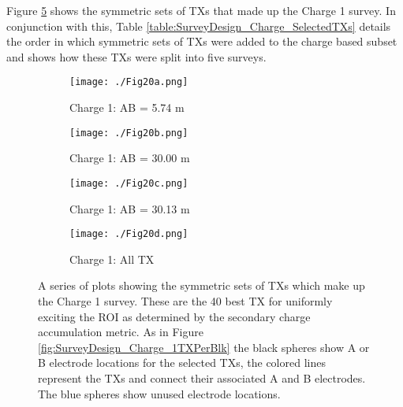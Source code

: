 \documentclass[preprint,authoryear,12pt]{elsarticle}
\begin{document}
Figure \ref{fig:SurveyDesign_Charge1_TXs} shows the symmetric sets of TXs that made up the Charge 1 survey. In conjunction with this, Table \ref{table:SurveyDesign_Charge_SelectedTXs} details the order in which symmetric sets of TXs were added to the charge based subset and shows how these TXs were split into five surveys.


\begin{figure} [htp]
   \begin{center}
      \begin{subfigure}{0.7\linewidth}
         \texttt{[image: ./Fig20a.png]}
         \caption{Charge 1: AB = 5.74 m}
         \label{fig:SurveyDesign_Charge1_ABsep5o745m}
      \end{subfigure}

      \begin{subfigure}{0.7\linewidth}
         \texttt{[image: ./Fig20b.png]}
         \caption{Charge 1: AB = 30.00 m}
         \label{fig:SurveyDesign_Charge1_ABsep30m}
      \end{subfigure}

      \begin{subfigure}{0.7\linewidth}
         \texttt{[image: ./Fig20c.png]}
         \caption{Charge 1: AB = 30.13 m}
         \label{fig:SurveyDesign_Charge1_ABsep30o13m}
      \end{subfigure}

      \begin{subfigure}{0.7\linewidth}
         \texttt{[image: ./Fig20d.png]}
         \caption{Charge 1: All TX}
         \label{fig:SurveyDesign_Charge1_Full}
      \end{subfigure}

    \end{center}
    \vspace{-0.5cm}
\caption{A series of plots showing the symmetric sets of TXs which make up the Charge 1 survey. These are the 40 best TX for uniformly exciting the ROI as determined by the secondary charge accumulation metric. As in Figure \ref{fig:SurveyDesign_Charge_1TXPerBlk} the black spheres show A or B electrode locations for the selected TXs, the colored lines represent the TXs and connect their associated A and B electrodes. The blue spheres show unused electrode locations.}
\label{fig:SurveyDesign_Charge1_TXs}
\end{figure}
\end{document}

